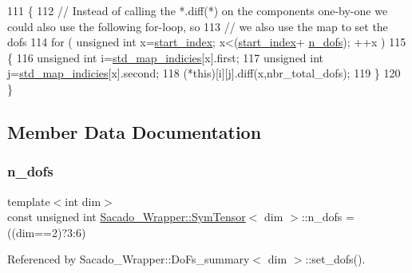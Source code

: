 \begin{DoxyCode}
111     \{
112         \textcolor{comment}{// Instead of calling the *.diff(*) on the components one-by-one we could also use the following
       for-loop, so}
113         \textcolor{comment}{// we also use the map to set the dofs}
114         \textcolor{keywordflow}{for} ( \textcolor{keywordtype}{unsigned} \textcolor{keywordtype}{int} x=\hyperlink{classSacado__Wrapper_1_1SymTensor_afe921e6044e4110fcfc848c52844d650}{start\_index}; x<(\hyperlink{classSacado__Wrapper_1_1SymTensor_afe921e6044e4110fcfc848c52844d650}{start\_index}+
      \hyperlink{classSacado__Wrapper_1_1SymTensor_a733bc4b029ff8d067b48e7ce3ee7606b}{n\_dofs}); ++x )
115         \{
116             \textcolor{keywordtype}{unsigned} \textcolor{keywordtype}{int} i=\hyperlink{classSacado__Wrapper_1_1SymTensor_ae3b1c56cde3fc5c7805b618ef3d9de75}{std\_map\_indicies}[x].first;
117             \textcolor{keywordtype}{unsigned} \textcolor{keywordtype}{int} j=\hyperlink{classSacado__Wrapper_1_1SymTensor_ae3b1c56cde3fc5c7805b618ef3d9de75}{std\_map\_indicies}[x].second;
118             (*this)[i][j].diff(x,nbr\_total\_dofs);
119         \}
120     \}
\end{DoxyCode}


\subsection{Member Data Documentation}
\mbox{\label{classSacado__Wrapper_1_1SymTensor_a733bc4b029ff8d067b48e7ce3ee7606b}} 
\subsubsection{\texorpdfstring{n\+\_\+dofs}{n\_dofs}}
{\footnotesize\ttfamily template$<$int dim$>$ \\
const unsigned int \hyperlink{classSacado__Wrapper_1_1SymTensor}{Sacado\+\_\+\+Wrapper\+::\+Sym\+Tensor}$<$ dim $>$\+::n\+\_\+dofs = ((dim==2)?3\+:6)\hspace{0.3cm}{\ttfamily [static]}}



Referenced by Sacado\+\_\+\+Wrapper\+::\+Do\+Fs\+\_\+summary$<$ dim $>$\+::set\+\_\+dofs().

